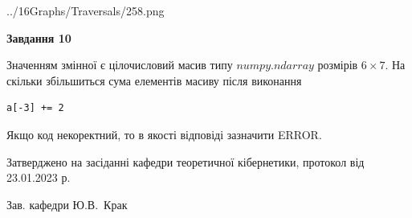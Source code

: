 \documentclass[12pt, ukrainian]{article}
\begin{document}
{\begin {large}
\begin{center}
	{../16Graphs/Traversals/258.png}
\end{center}\par
\newpage

{\begin {center}\textbf{Завдання 10}\end {center}}\par
Значенням змінної  є цілочисловий масив типу $numpy.ndarray$ розмірів $6{\times}7$. На скільки збільшиться сума елементів масиву  після виконання
\begin{verbatim}
a[-3] += 2
\end{verbatim}


Якщо код некоректний, то в якості відповіді зазначити ERROR.\par
\newpage


\end {large}
}
{\smallskip \begin {small} Затверджено на засіданні кафедри теоретичної кібернетики, протокол  від   23.01.2023 р.\par\smallskip\smallskip
{\parbox {6.5 cm}{Зав. кафедри \dotfill Ю.В.~Крак}} \end{small}}
\end{document}

